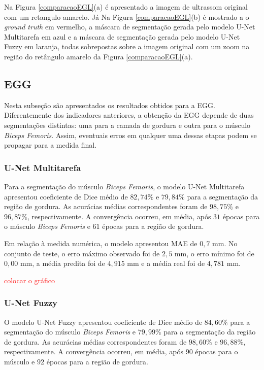 Na Figura \ref{comparacaoEGL}(a) é apresentado a imagem de ultrassom original com um retangulo amarelo. Já Na Figura \ref{comparacaoEGL}(b) é mostrado a o \textit{ground truth} em vermelho, a máscara de segmentação gerada pelo modelo U-Net Multitarefa em azul e a máscara de segmentação gerada pelo modelo U-Net Fuzzy em laranja, todas sobrepostas sobre a imagem original com um zoom na região do retângulo amarelo da Figura \ref{comparacaoEGL}(a).

\subsection{EGG}
Nesta subseção são apresentados os resultados obtidos para a EGG. Diferentemente dos indicadores anteriores, a obtenção da EGG depende de duas segmentações distintas: uma para a camada de gordura e outra para o músculo \textit{Biceps Femoris}. Assim, eventuais erros em qualquer uma dessas etapas podem se propagar para a medida final.

\subsubsection{U-Net Multitarefa}


Para a segmentação do músculo \textit{Biceps Femoris}, o modelo U-Net Multitarefa apresentou coeficiente de Dice médio de $82,74\%$  e $79,84\%$ para a segmentação da região de gordura. As acurácias médias correspondentes foram de $98,75\%$ e $96,87\%$, respectivamente. A convergência ocorreu, em média, após $31$ épocas para o músculo \textit{Biceps Femoris} e $61$ épocas para a região de gordura.

Em relação à medida numérica, o modelo apresentou MAE de $0,7$ mm. No conjunto de teste, o erro máximo observado foi de $2,5$ mm, o erro mínimo foi de $0,00$ mm, a média predita foi de $4,915$ mm e a média real foi de $4,781$ mm.

\textcolor{red}{colocar o gráfico}
\subsubsection{U-Net Fuzzy}

O modelo U-Net Fuzzy apresentou coeficiente de Dice médio de $84,60\%$ para a segmentação do músculo \textit{Biceps Femoris} e $79,99\%$ para a segmentação da região de gordura. As acurácias médias correspondentes foram de $98,60\%$ e $96,88\%$, respectivamente. A convergência ocorreu, em média, após $90$ épocas para o músculo e $92$ épocas para a região de gordura.

